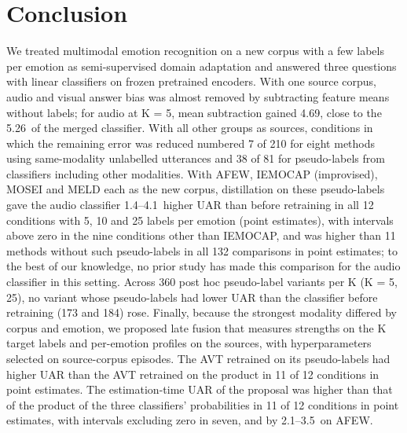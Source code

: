 \section{Conclusion}\label{sec:conclusion}

We treated multimodal emotion recognition on a new corpus with a few labels per emotion as semi-supervised domain adaptation and answered three questions with linear classifiers on frozen pretrained encoders. With one source corpus, audio and visual answer bias was almost removed by subtracting feature means without labels; for audio at K = 5, mean subtraction gained 4.69\pt, close to the 5.26\pt\ of the merged classifier. With all other groups as sources, conditions in which the remaining error was reduced numbered 7 of 210 for eight methods using same-modality unlabelled utterances and 38 of 81 for pseudo-labels from classifiers including other modalities. With AFEW, IEMOCAP (improvised), MOSEI and MELD each as the new corpus, distillation on these pseudo-labels gave the audio classifier 1.4--4.1\pt\ higher UAR than before retraining in all 12 conditions with 5, 10 and 25 labels per emotion (point estimates), with intervals above zero in the nine conditions other than IEMOCAP, and was higher than 11 methods without such pseudo-labels in all 132 comparisons in point estimates; to the best of our knowledge, no prior study has made this comparison for the audio classifier in this setting. Across 360 post hoc pseudo-label variants per K (K = 5, 25), no variant whose pseudo-labels had lower UAR than the classifier before retraining (173 and 184) rose. Finally, because the strongest modality differed by corpus and emotion, we proposed late fusion that measures strengths on the K target labels and per-emotion profiles on the sources, with hyperparameters selected on source-corpus episodes. The AVT retrained on its pseudo-labels had higher UAR than the AVT retrained on the product in 11 of 12 conditions in point estimates. The estimation-time UAR of the proposal was higher than that of the product of the three classifiers' probabilities in 11 of 12 conditions in point estimates, with intervals excluding zero in seven, and by 2.1--3.5\pt\ on AFEW.
